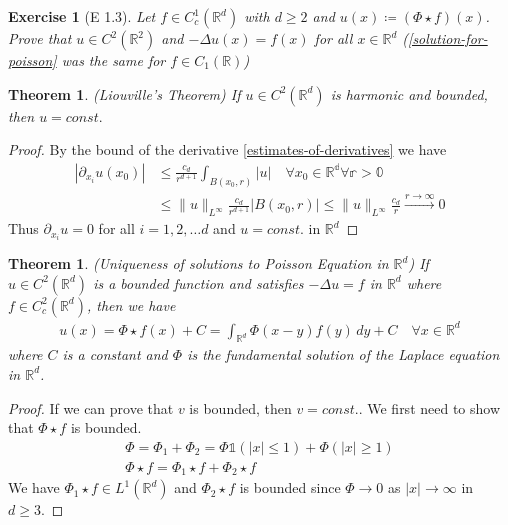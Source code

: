 \documentclass{report}
\theoremstyle{tommy}
\newtheorem{thm}[defn]{Theorem}
\newtheorem{ex}[defn]{Exercise}
\begin{document}
\begin{ex}[E 1.3]
  Let \(f \in C_c^1(\mathbb{R}^d)\) with \(d \ge 2\) and \(u(x) \coloneqq (\Phi \star f)(x)\). Prove that \(u \in C^2(\mathbb{R}^2)\) and \(- \Delta u(x) = f(x)\) for all \(x \in \mathbb{R}^d\) (\ref{solution-for-poisson} was the same for \(f \in C_1(\mathbb{R})\))
\end{ex}

\begin{thm} (Liouville's Theorem) 
  If \(u \in C^2(\mathbb{R}^d)\) is harmonic and bounded, then \(u = const.\)
\end{thm}

\begin{proof}
  By the bound of the derivative \ref{estimates-of-derivatives} we have
  \begin{align*}
    |\partial_{x_i} u(x_0)| 
    &\le \frac{c_d}{r^{d+1}} \int_{B(x_0, r)} |u| \quad \forall x_0 \in \mathbb{{R}^d \forall r > 0} \\
    &\le \|u\|_{L^\infty} \frac{c_d}{r^{d+1}} |B(x_0, r)| \le \|u\|_{L^\infty} \frac{c_d}{r} \xrightarrow{r \to \infty} 0
  \end{align*}
  Thus \(\partial_{x_i} u = 0\) for all \(i = 1, 2, \dots d\) and \(u = const.\) in \(\mathbb{R}^d\)
\end{proof}

\begin{thm} (Uniqueness of solutions to Poisson Equation in \(\mathbb{R}^d\))
  If \(u \in C^2(\mathbb{R}^d)\) is a bounded function and satisfies \(- \Delta u = f\) in \(\mathbb{R}^d\) where \(f \in C_c^2(\mathbb{R}^d)\), then we have
  \begin{align*}
    u(x) = \Phi \star f(x) + C = \int_{\mathbb{R}^d} \Phi(x-y)f(y) \, dy + C \quad \forall x \in \mathbb{R}^d
  \end{align*}
  where \(C\) is a constant and \(\Phi\) is the fundamental solution of the Laplace equation in \(\mathbb{R}^d\).
\end{thm}

\begin{proof}
  If we can prove that \(v\) is bounded, then \(v = const.\). We first need to show that \(\Phi \star f\) is bounded.
  \begin{align*}
    \Phi = \Phi_1 + \Phi_2 = \Phi \mathbb{1}(|x| \le 1) + \Phi(|x| \ge 1) \\
    \Phi \star f = \Phi_1 \star f + \Phi_2 \star f
  \end{align*}
  We have \(\Phi_1 \star f \in L^1(\mathbb{R}^d)\) and \(\Phi_2 \star f\) is bounded since \(\Phi \to 0\)  as \(|x| \to \infty\)  in \(d \ge 3\).
\end{proof}
\end{document}
